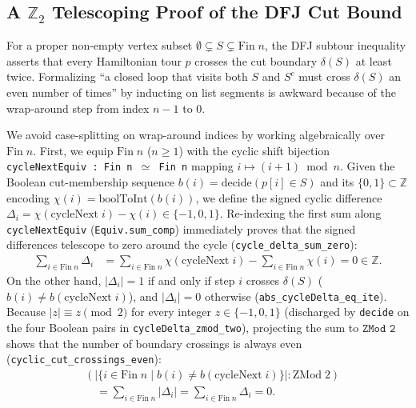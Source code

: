 \subsection{A \texorpdfstring{$\mathbb{Z}_2$}{Z2} Telescoping Proof of the DFJ Cut Bound}

For a proper non-empty vertex subset $\emptyset \subsetneq S \subsetneq \mathrm{Fin}\;n$, the DFJ subtour inequality asserts that every Hamiltonian tour $p$ crosses the cut boundary $\delta(S)$ at least twice. Formalizing ``a closed loop that visits both $S$ and $S^c$ must cross $\delta(S)$ an even number of times'' by inducting on list segments is awkward because of the wrap-around step from index $n-1$ to $0$.

We avoid case-splitting on wrap-around indices by working algebraically over $\mathrm{Fin}\;n$. First, we equip $\mathrm{Fin}\;n$ ($n \ge 1$) with the cyclic shift bijection \texttt{cycleNextEquiv : Fin n $\simeq$ Fin n} mapping $i \mapsto (i + 1) \bmod n$. Given the Boolean cut-membership sequence $b(i) = \mathrm{decide}(p[i] \in S)$ and its $\{0,1\} \subset \mathbb{Z}$ encoding $\chi(i) = \mathrm{boolToInt}(b(i))$, we define the signed cyclic difference $\Delta_i = \chi(\mathrm{cycleNext}\;i) - \chi(i) \in \{-1, 0, 1\}$. Re-indexing the first sum along \texttt{cycleNextEquiv} (\texttt{Equiv.sum\_comp}) immediately proves that the signed differences telescope to zero around the cycle (\texttt{cycle\_delta\_sum\_zero}):
\begin{equation}
\begin{aligned}
  \sum_{i \in \mathrm{Fin}\;n} \Delta_i
  &= \sum_{i \in \mathrm{Fin}\;n} \chi(\mathrm{cycleNext}\;i) - \sum_{i \in \mathrm{Fin}\;n} \chi(i) = 0 \in \mathbb{Z}.
\end{aligned}
\end{equation}
On the other hand, $|\Delta_i| = 1$ if and only if step $i$ crosses $\delta(S)$ ($b(i) \ne b(\mathrm{cycleNext}\;i)$), and $|\Delta_i| = 0$ otherwise (\texttt{abs\_cycleDelta\_eq\_ite}). Because $|z| \equiv z \pmod 2$ for every integer $z \in \{-1, 0, 1\}$ (discharged by \texttt{decide} on the four Boolean pairs in \texttt{cycleDelta\_zmod\_two}), projecting the sum to $\texttt{ZMod 2}$ shows that the number of boundary crossings is always even (\texttt{cyclic\_cut\_crossings\_even}):
\begin{equation}
\begin{aligned}
  &\left(|\{i \in \mathrm{Fin}\;n \mid b(i) \ne b(\mathrm{cycleNext}\;i)\}| : \mathrm{ZMod}\;2\right) \\
  &\quad = \sum_{i \in \mathrm{Fin}\;n} |\Delta_i| = \sum_{i \in \mathrm{Fin}\;n} \Delta_i = 0.
\end{aligned}
\end{equation}
